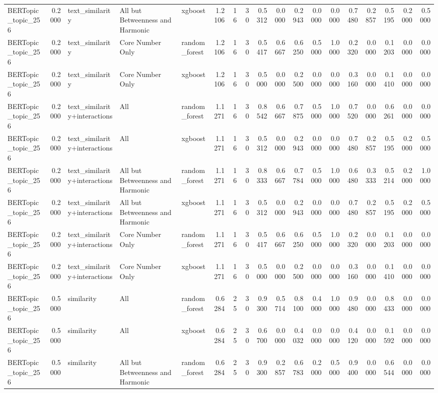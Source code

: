 \begin{tabular}{lrlllrrrrrrrrrrrrr}
BERTopic_topic_256 & 0.2000 & text_similarity & All but Betweenness and Harmonic & xgboost & 1.2106 & 16 & 30 & 0.5312 & 0.0000 & 0.2943 & 0.0000 & 0.0000 & 0.7480 & 0.2857 & 0.5195 & 0.2000 & 0.5000 \\
BERTopic_topic_256 & 0.2000 & text_similarity & Core Number Only & random_forest & 1.2106 & 16 & 30 & 0.5417 & 0.6667 & 0.6250 & 0.5000 & 1.0000 & 0.2320 & 0.0000 & 0.1203 & 0.0000 & 0.0000 \\
BERTopic_topic_256 & 0.2000 & text_similarity & Core Number Only & xgboost & 1.2106 & 16 & 30 & 0.5000 & 0.0000 & 0.2500 & 0.0000 & 0.0000 & 0.3160 & 0.0000 & 0.1410 & 0.0000 & 0.0000 \\
BERTopic_topic_256 & 0.2000 & text_similarity+interactions & All & random_forest & 1.1271 & 16 & 30 & 0.8542 & 0.6667 & 0.7875 & 0.5000 & 1.0000 & 0.7520 & 0.0000 & 0.6261 & 0.0000 & 0.0000 \\
BERTopic_topic_256 & 0.2000 & text_similarity+interactions & All & xgboost & 1.1271 & 16 & 30 & 0.5312 & 0.0000 & 0.2943 & 0.0000 & 0.0000 & 0.7480 & 0.2857 & 0.5195 & 0.2000 & 0.5000 \\
BERTopic_topic_256 & 0.2000 & text_similarity+interactions & All but Betweenness and Harmonic & random_forest & 1.1271 & 16 & 30 & 0.8333 & 0.6667 & 0.7784 & 0.5000 & 1.0000 & 0.6480 & 0.3333 & 0.5214 & 0.2000 & 1.0000 \\
BERTopic_topic_256 & 0.2000 & text_similarity+interactions & All but Betweenness and Harmonic & xgboost & 1.1271 & 16 & 30 & 0.5312 & 0.0000 & 0.2943 & 0.0000 & 0.0000 & 0.7480 & 0.2857 & 0.5195 & 0.2000 & 0.5000 \\
BERTopic_topic_256 & 0.2000 & text_similarity+interactions & Core Number Only & random_forest & 1.1271 & 16 & 30 & 0.5417 & 0.6667 & 0.6250 & 0.5000 & 1.0000 & 0.2320 & 0.0000 & 0.1203 & 0.0000 & 0.0000 \\
BERTopic_topic_256 & 0.2000 & text_similarity+interactions & Core Number Only & xgboost & 1.1271 & 16 & 30 & 0.5000 & 0.0000 & 0.2500 & 0.0000 & 0.0000 & 0.3160 & 0.0000 & 0.1410 & 0.0000 & 0.0000 \\
BERTopic_topic_256 & 0.5000 & similarity & All & random_forest & 0.6284 & 25 & 30 & 0.9300 & 0.5714 & 0.8100 & 0.4000 & 1.0000 & 0.9480 & 0.0000 & 0.8433 & 0.0000 & 0.0000 \\
BERTopic_topic_256 & 0.5000 & similarity & All & xgboost & 0.6284 & 25 & 30 & 0.6700 & 0.0000 & 0.4032 & 0.0000 & 0.0000 & 0.4120 & 0.0000 & 0.1592 & 0.0000 & 0.0000 \\
BERTopic_topic_256 & 0.5000 & similarity & All but Betweenness and Harmonic & random_forest & 0.6284 & 25 & 30 & 0.9300 & 0.2857 & 0.6783 & 0.2000 & 0.5000 & 0.9400 & 0.0000 & 0.6544 & 0.0000 & 0.0000 \\

\end{tabular}
